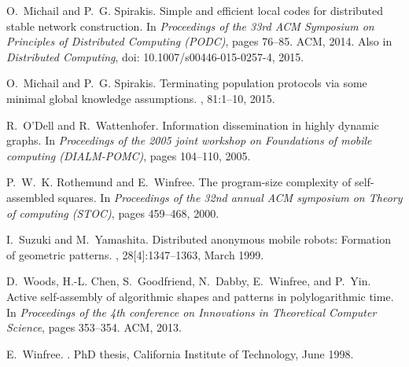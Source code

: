 \documentclass[preprint]{elsarticle}
\begin{document}
\begin{thebibliography}{CKLWL09}
O.~Michail and P.~G. Spirakis.
\newblock Simple and efficient local codes for distributed stable network
  construction.
\newblock In {\em Proceedings of the 33rd ACM Symposium on Principles of
  Distributed Computing (PODC)}, pages 76--85. ACM, 2014.
\newblock Also in \emph{Distributed Computing}, doi: 10.1007/s00446-015-0257-4,
  2015.

O.~Michail and P.~G. Spirakis.
\newblock Terminating population protocols via some minimal global knowledge
  assumptions.
, 81:1--10,
  2015.

R.~O'Dell and R.~Wattenhofer.
\newblock Information dissemination in highly dynamic graphs.
\newblock In {\em Proceedings of the 2005 joint workshop on Foundations of
  mobile computing (DIALM-POMC)}, pages 104--110, 2005.

P.~W.~K. Rothemund and E.~Winfree.
\newblock The program-size complexity of self-assembled squares.
\newblock In {\em Proceedings of the 32nd annual ACM symposium on Theory of
  computing (STOC)}, pages 459--468, 2000.

I.~Suzuki and M.~Yamashita.
\newblock Distributed anonymous mobile robots: Formation of geometric patterns.
, 28[4]:1347--1363, March 1999.

D.~Woods, H.-L. Chen, S.~Goodfriend, N.~Dabby, E.~Winfree, and P.~Yin.
\newblock Active self-assembly of algorithmic shapes and patterns in
  polylogarithmic time.
\newblock In {\em Proceedings of the 4th conference on Innovations in
  Theoretical Computer Science}, pages 353--354. ACM, 2013.

E.~Winfree.
.
\newblock PhD thesis, California Institute of Technology, June 1998.

\end{thebibliography}
\end{document}
